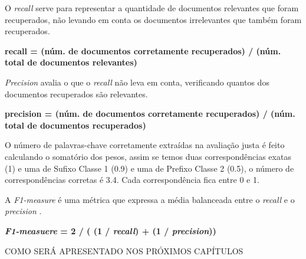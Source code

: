 O \emph{recall} serve para representar a quantidade de documentos relevantes que foram recuperados, não levando em conta os documentos irrelevantes que também foram recuperados.
\\
\begin{center}
\textbf{
recall = (núm. de documentos corretamente recuperados) / (núm. total de documentos relevantes)
}
\end{center}

\emph{Precision} avalia o que o \emph{recall} não leva em conta, verificando quantos dos documentos recuperados são relevantes.
\begin{center}
\textbf{
precision = (núm. de documentos corretamente recuperados) / (núm. total de documentos recuperados)
}
\end{center}

O número de palavras-chave corretamente extraídas na avaliação justa é feito calculando o somatório dos pesos, assim se temos duas correspondências exatas (1) e uma de Sufixo Classe 1 (0.9) e uma de Prefixo Classe 2 (0.5), o número de correspondências corretas é 3.4. Cada correspondência fica entre 0 e 1.

A \emph{F1-measure} é uma métrica que expressa a média balanceada entre o \emph{recall} e o \emph{precision} \cite{Feldman2007}.
\begin{center}
\textbf{
\emph{F1-measuere} = 2 / ( (1 / \emph{recall}) + (1 / \emph{precision}))
}
\end{center}

COMO SERÁ APRESENTADO NOS PRÓXIMOS CAPÍTULOS

